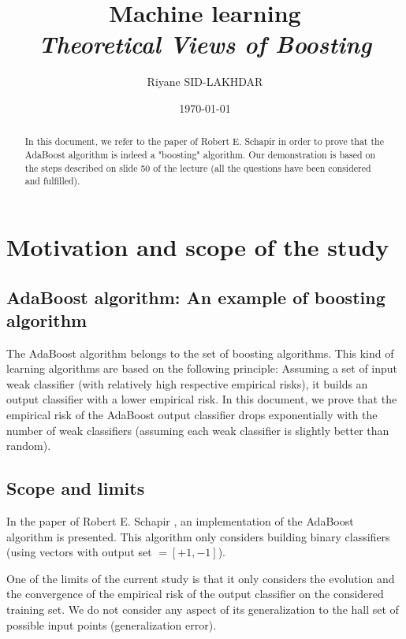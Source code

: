 \documentclass[12pt]{article}											%
\title
{
	Machine learning\\
    \emph{Theoretical Views of Boosting}
}
\author{Riyane SID-LAKHDAR}
\date{\today}
\begin{document}
\maketitle

\begin{abstract}
In this document, we refer to the paper of Robert E. Schapir \cite{mainPaper} in order to prove that the AdaBoost algorithm is indeed a "boosting" algorithm.    Our demonstration is based on the steps described on slide 50 of the lecture (all the questions have been considered and fulfilled).
\end{abstract}
\tableofcontents
\newpage

\section{Motivation and scope of the study}
\subsection{AdaBoost algorithm: An example of boosting algorithm}
The AdaBoost algorithm belongs to the set of boosting algorithms.   This kind of learning algorithms are based on the following principle:  Assuming a set of input weak classifier (with relatively high respective empirical risks), it builds an output classifier with a lower empirical risk.   In this document, we prove that the empirical risk of the AdaBoost output classifier drops exponentially with the number of weak classifiers (assuming each weak classifier is slightly better than random).


\subsection{Scope and limits}
In the paper of Robert E. Schapir \cite{mainPaper}, an implementation of the AdaBoost algorithm is presented.   This algorithm only considers building binary classifiers (using vectors with output set $= [+1, -1]$).

One of the limits of the current study is that it only considers the evolution and the convergence of the empirical risk  of the output classifier on the considered training set.   We do not consider any aspect of its generalization to the hall set of possible input points (generalization error).



\end{document}
